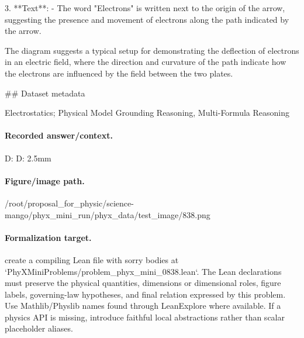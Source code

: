 3. **Text**:
   - The word "Electrons" is written next to the origin of the arrow, suggesting the presence and movement of electrons along the path indicated by the arrow.

The diagram suggests a typical setup for demonstrating the deflection of electrons in an electric field, where the direction and curvature of the path indicate how the electrons are influenced by the field between the two plates.

\#\# Dataset metadata

Electrostatics; Physical Model Grounding Reasoning, Multi-Formula Reasoning

\paragraph{Recorded answer/context.}
D: D: 2.5mm

\paragraph{Figure/image path.}
/root/proposal\_for\_physic/science-mango/phyx\_mini\_run/phyx\_data/test\_image/838.png

\paragraph{Formalization target.}
create a compiling Lean file with sorry bodies at `PhyXMiniProblems/problem\_phyx\_mini\_0838.lean`. The Lean declarations must preserve the physical quantities, dimensions or dimensional roles, figure labels, governing-law hypotheses, and final relation expressed by this problem.
Use Mathlib/Physlib names found through LeanExplore where available. If a physics API is missing, introduce faithful local abstractions rather than scalar placeholder aliases.

